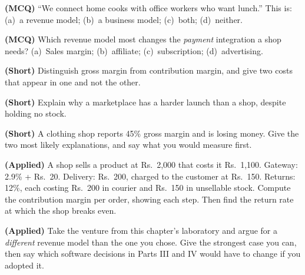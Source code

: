 \begin{reviewq}
  \item \textbf{(MCQ)} ``We connect home cooks with office workers who want
        lunch.'' This is: (a)~a revenue model; (b)~a business model; (c)~both;
        (d)~neither.
  \item \textbf{(MCQ)} Which revenue model most changes the \emph{payment}
        integration a shop needs? (a)~Sales margin; (b)~affiliate;
        (c)~subscription; (d)~advertising.
  \item \textbf{(Short)} Distinguish gross margin from contribution margin, and
        give two costs that appear in one and not the other.
  \item \textbf{(Short)} Explain why a marketplace has a harder launch than a
        shop, despite holding no stock.
  \item \textbf{(Short)} A clothing shop reports 45\% gross margin and is losing
        money. Give the two most likely explanations, and say what you would
        measure first.
  \item \textbf{(Applied)} A shop sells a product at Rs.~2{,}000 that costs it
        Rs.~1{,}100. Gateway: 2.9\% + Rs.~20. Delivery: Rs.~200, charged to the
        customer at Rs.~150. Returns: 12\%, each costing Rs.~200 in courier and
        Rs.~150 in unsellable stock. Compute the contribution margin per order,
        showing each step. Then find the return rate at which the shop breaks
        even.
  \item \textbf{(Applied)} Take the venture from this chapter's laboratory and
        argue for a \emph{different} revenue model than the one you chose. Give
        the strongest case you can, then say which software decisions in Parts
        III and IV would have to change if you adopted it.
\end{reviewq}
